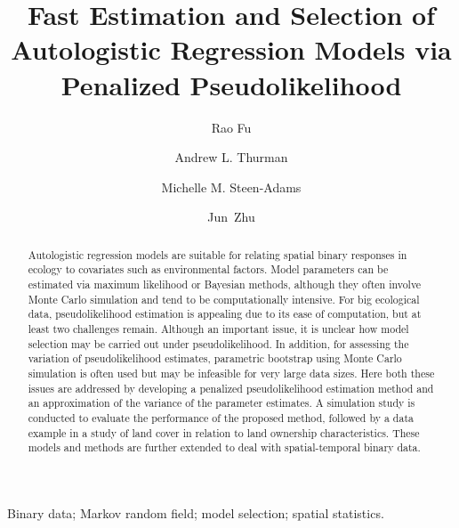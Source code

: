 \documentclass[authoryear,review, 12pt]{elsarticle}
\begin{document}
\begin{frontmatter}

\title{Fast Estimation and Selection of Autologistic Regression Models via Penalized Pseudolikelihood}

\author[rfu]{Rao Fu}

\author[athurman]{Andrew L. Thurman}


\author[msteen]{Michelle M. Steen-Adams}

\author[jzhu]{Jun~Zhu}

\address[rfu]{Department of Statistics, University of Wisconsin, Madison, WI 53706}
\address[athurman]{Department of Statistics, University of Wisconsin, Madison, WI 53706}
\address[msteen]{Department of Environmental Studies, University of New England, Biddeford, ME 04005}
\address[jzhu]{Department of Statistics and Department of Entomology, University of Wisconsin, Madison, WI 53706}

\begin{abstract}
Autologistic regression models are suitable for relating spatial binary responses in ecology to covariates such as environmental factors.  Model parameters can be estimated via maximum likelihood or Bayesian methods, although they often involve Monte Carlo simulation and tend to be computationally intensive.  For big ecological data, pseudolikelihood estimation is appealing due to its ease of computation, but at least two challenges remain.  Although an important issue, it is unclear how model selection may be carried out under pseudolikelihood.  In addition, for assessing the variation of pseudolikelihood estimates, parametric bootstrap using Monte Carlo simulation is often used but may be infeasible for very large data sizes.  Here both these issues are addressed by developing a penalized pseudolikelihood estimation method and an approximation of the variance of the parameter estimates.   A simulation study is conducted to evaluate the performance of the proposed method, followed by a data example in a study of land cover in relation to land ownership characteristics.  These models and methods are further extended to deal with spatial-temporal binary data.
\end{abstract}

\begin{keyword}
Binary data; Markov random field; model selection; spatial statistics.
\end{keyword}

\end{frontmatter}
\end{document}
